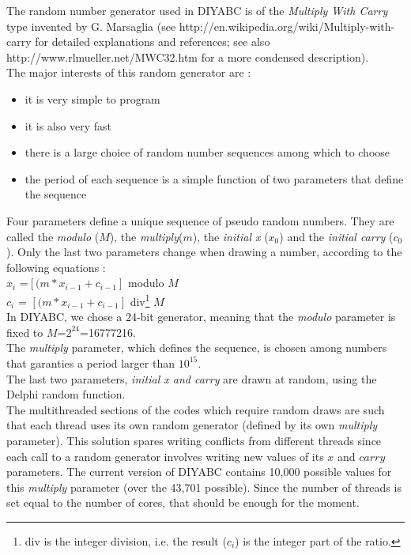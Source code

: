 The random number generator used in DIYABC is of the \emph{Multiply With Carry} type invented by G. Marsaglia (see http://en.wikipedia.org/wiki/Multiply-with-carry for detailed explanations and references; see also http://www.rlmueller.net/MWC32.htm for a more condensed description).\\
The major interests of this random generator are :
\begin{itemize}
\item  it is very simple to program 
\item it is also very fast
\item there is a large choice of random number sequences among which to choose
\item the period of each sequence is a simple function of two parameters that define the sequence
\end{itemize} 

Four parameters define a unique sequence of pseudo random numbers. They are called the \emph{modulo} ($M$), the \emph{multiply}($m$), the \emph{initial x} ($x_0$) and the \emph{initial carry} ($c_0$). Only the last two parameters change when drawing a number, according to the following equations : \\

$x_i$ =$ [(m * x_{i-1} + c_{i-1}] $ \textsf{modulo} $M$\\  

$c_i$ = $[(m * x_{i-1} + c_{i-1}]$  \textsf{div}\footnote{\textsf{div} is the integer division, i.e. the result ($c_i$) is the integer part of the ratio.} $M$\\

In DIYABC, we chose a 24-bit generator, meaning that the \emph{modulo} parameter is fixed to $M$=$2^{24}$=16777216.\\
The \emph{multiply} parameter, which defines the sequence, is chosen among numbers that garanties a period larger than $10^{15}$. \\
The last two parameters, \emph{initial x and carry} are drawn at random, using the Delphi \textsf{random} function. \\

The multithreaded sections of the codes which require random draws are such that each thread uses its own random generator (defined by its own \emph{multiply} parameter). This solution spares writing conflicts from different threads since each call to a random generator involves writing new values of its $x$ and $carry$ parameters. 
The current version of DIYABC contains 10,000 possible values for this \emph{multiply} parameter (over the 43,701 possible). Since the number of threads is set equal to the number of cores, that should be enough for the moment.\\

